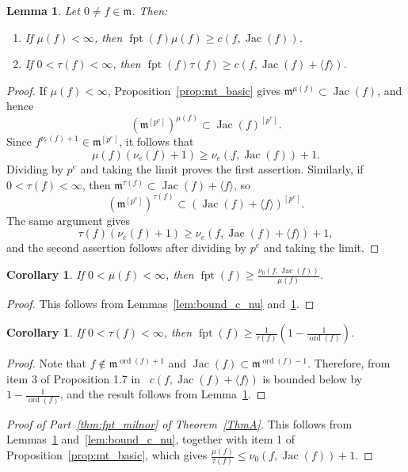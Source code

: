 \documentclass{article}
\newtheorem{lemma}[theorem]{Lemma}
\newtheorem{corollary}[theorem]{Corollary}
\DeclareMathOperator{\ord}{ord}
\DeclareMathOperator{\Jac}{Jac}
\DeclareMathOperator{\fpt}{fpt}
\numberwithin{theorem}{section}
\begin{document}
\begin{lemma}\label{lem:c(f,Jac)_fpt}
Let $0\neq f\in\mathfrak{m}$. Then:
\begin{enumerate}
    \item If $\mu(f)<\infty$, then $\fpt(f)\mu(f)\geq c(f,\Jac(f))$.
    \item If $0<\tau(f)<\infty$, then $\fpt(f)\tau(f)\geq c(f,\Jac(f)+\langle f\rangle)$.
\end{enumerate}
\end{lemma}

\begin{proof}
If $\mu(f)<\infty$, Proposition~\ref{prop:mt_basic} gives $\mathfrak{m}^{\mu(f)}\subset\Jac(f)$, and hence
\[
(\mathfrak{m}^{[p^e]})^{\mu(f)}\subset\Jac(f)^{[p^e]}.
\]
Since $f^{\nu_e(f)+1}\in\mathfrak{m}^{[p^e]}$, it follows that
\[
\mu(f)(\nu_e(f)+1)\geq\nu_e(f,\Jac(f))+1.
\]
Dividing by $p^e$ and taking the limit proves the first assertion.  Similarly, if $0<\tau(f)<\infty$, then $\mathfrak{m}^{\tau(f)}\subset\Jac(f)+\langle f\rangle$, so
\[
(\mathfrak{m}^{[p^e]})^{\tau(f)}
\subset(\Jac(f)+\langle f\rangle)^{[p^e]}.
\]
The same argument gives
\[
\tau(f)(\nu_e(f)+1)
\geq\nu_e(f,\Jac(f)+\langle f\rangle)+1,
\]
and the second assertion follows after dividing by $p^e$ and taking the limit.
\end{proof}

\begin{corollary}\label{cor:BS_F}
If $0<\mu(f)<\infty$, then $\fpt(f)\geq\frac{\nu_0(f,\Jac(f))}{\mu(f)}$.
\end{corollary}

\begin{proof}
This follows from Lemmas~\ref{lem:bound_c_nu} and~\ref{lem:c(f,Jac)_fpt}.
\end{proof}

\begin{corollary}
If $0<\tau(f)<\infty$, then $\fpt(f)\geq\frac{1}{\tau(f)}\left(1-\frac{1}{\ord(f)}\right)$.
\end{corollary}

\begin{proof}
Note that $f\notin\mathfrak{m}^{\ord(f)+1}$ and $\Jac(f)\subset\mathfrak{m}^{\ord(f)-1}$. Therefore, from item 3 of Proposition 1.7 in~\cite{mustata2005f} $c(f,\Jac(f)+\langle f\rangle)$ is bounded below by $1-\frac{1}{\ord(f)}$, and the result follows from Lemma~\ref{lem:c(f,Jac)_fpt}.
\end{proof}

\begin{proof}[Proof of Part~\ref{thm:fpt_milnor} of Theorem~\ref{ThmA}]
This follows from Lemmas~\ref{lem:c(f,Jac)_fpt} and~\ref{lem:bound_c_nu}, together with item 1 of Proposition~\ref{prop:mt_basic}, which gives $\frac{\mu(f)}{\tau(f)}\leq\nu_0(f,\Jac(f))+1$.
\end{proof}
\end{document}
